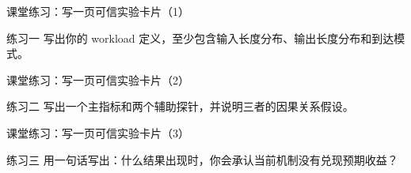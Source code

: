 \begin{frame}{课堂练习：写一页可信实验卡片（1）}
\begin{block}{练习一}
    写出你的 workload 定义，至少包含输入长度分布、输出长度分布和到达模式。
  \end{block}
\end{frame}

\begin{frame}{课堂练习：写一页可信实验卡片（2）}
\begin{block}{练习二}
    写出一个主指标和两个辅助探针，并说明三者的因果关系假设。
  \end{block}
\end{frame}

\begin{frame}{课堂练习：写一页可信实验卡片（3）}
\begin{block}{练习三}
    用一句话写出：什么结果出现时，你会承认当前机制没有兑现预期收益？
  \end{block}
\end{frame}
